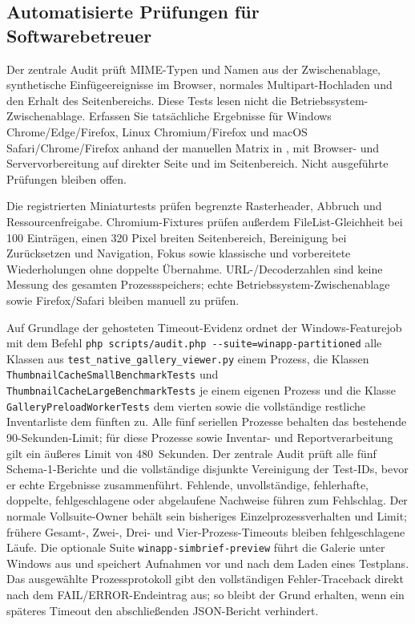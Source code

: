 \documentclass[11pt,a4paper]{article}
\newcommand{\filepath}[1]{\path{#1}}
\newcommand{\codeword}[1]{\nolinkurl{#1}}
\begin{document}
\subsection{Automatisierte Prüfungen für Softwarebetreuer}

Der zentrale Audit prüft MIME-Typen und Namen aus der Zwischenablage,
synthetische Einfügeereignisse im Browser, normales Multipart-Hochladen und den
Erhalt des Seitenbereichs. Diese Tests lesen nicht die
Betriebssystem-Zwischenablage. Erfassen Sie tatsächliche Ergebnisse für Windows
Chrome/Edge/Firefox, Linux Chromium/Firefox und macOS Safari/Chrome/Firefox
anhand der manuellen Matrix in \filepath{TESTING.md}, mit Browser- und
Servervorbereitung auf direkter Seite und im Seitenbereich. Nicht ausgeführte
Prüfungen bleiben offen.

Die registrierten Miniaturtests prüfen begrenzte Rasterheader, Abbruch und
Ressourcenfreigabe. Chromium-Fixtures prüfen außerdem FileList-Gleichheit bei
100 Einträgen, einen 320 Pixel breiten Seitenbereich, Bereinigung bei
Zurücksetzen und Navigation, Fokus sowie klassische und vorbereitete
Wiederholungen ohne doppelte Übernahme. URL-/Decoderzahlen sind keine Messung
des gesamten Prozessspeichers; echte Betriebssystem-Zwischenablage sowie
Firefox/Safari bleiben manuell zu prüfen.

Auf Grundlage der gehosteten Timeout-Evidenz ordnet der Windows-Featurejob
mit dem Befehl \codeword{php scripts/audit.php --suite=winapp-partitioned}
alle Klassen aus \codeword{test_native_gallery_viewer.py} einem Prozess,
die Klassen \codeword{ThumbnailCacheSmallBenchmarkTests} und
\codeword{ThumbnailCacheLargeBenchmarkTests} je einem eigenen Prozess und die
Klasse \codeword{GalleryPreloadWorkerTests} dem vierten sowie die
vollständige restliche Inventarliste dem fünften zu. Alle fünf seriellen
Prozesse behalten das bestehende 90-Sekunden-Limit; für diese Prozesse sowie
Inventar- und Reportverarbeitung gilt ein äußeres Limit von 480~Sekunden. Der
zentrale Audit prüft alle fünf Schema-1-Berichte und die vollständige
disjunkte Vereinigung der Test-IDs, bevor er echte Ergebnisse zusammenführt.
Fehlende, unvollständige, fehlerhafte, doppelte, fehlgeschlagene oder
abgelaufene Nachweise führen zum Fehlschlag. Der normale Vollsuite-Owner behält
sein bisheriges Einzelprozessverhalten und Limit; frühere Gesamt-, Zwei-, Drei-
und Vier-Prozess-Timeouts bleiben fehlgeschlagene Läufe.
Die optionale Suite \codeword{winapp-simbrief-preview} führt die Galerie unter
Windows aus und speichert Aufnahmen vor und nach dem Laden eines Testplans.
Das ausgewählte Prozessprotokoll gibt den vollständigen Fehler-Traceback direkt
nach dem FAIL/ERROR-Endeintrag aus; so bleibt der Grund erhalten, wenn ein
späteres Timeout den abschließenden JSON-Bericht verhindert.
\end{document}
